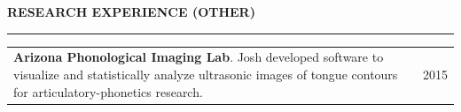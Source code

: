 \documentclass{resume} %
\begin{document}


\vspace{.25cm}
\sectionskip
\MakeUppercase{\textbf{Research Experience (Other)}}
  \sectionlineskip
  \hrule
\vspace{.5cm}



\begin{tabular}{@{}p{}p{}@{}}
  {\bf Arizona Phonological Imaging Lab}.
   Josh developed software to visualize and statistically analyze ultrasonic images of tongue contours for articulatory-phonetics research.
   &
\hfill {2015}
\end{tabular}


\end{document}
